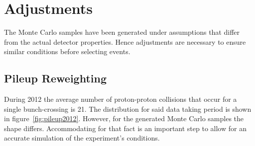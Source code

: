 \section{Adjustments}

The Monte Carlo samples have been generated under assumptions that differ from the actual detector properties. Hence adjustments are necessary to ensure similar conditions before selecting events.


\subsection{Pileup Reweighting}
\label{sec:pileup}

During 2012 the average number of proton-proton collisions that occur for a single bunch-crossing is 21. The distribution for said data taking period is shown in figure~\ref{fig:pileup2012}. However, for the generated Monte Carlo samples the shape differs. Accommodating for that fact is an important step to allow for an accurate simulation of the experiment's conditions.

